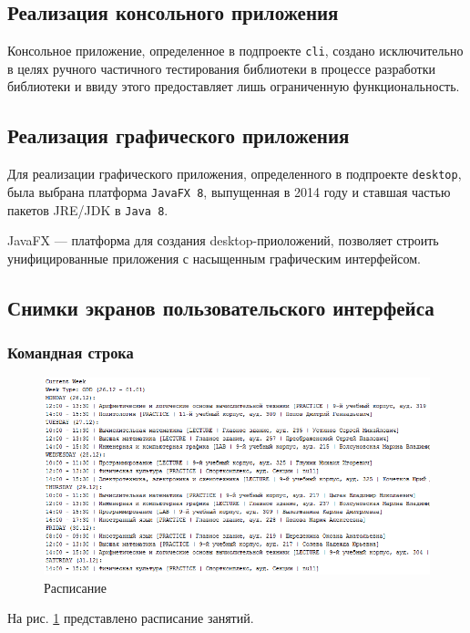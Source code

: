 \subsection{Реализация консольного приложения}

Консольное приложение, определенное в подпроекте \texttt{cli}, создано исключительно в целях ручного частичного тестирования библиотеки в процессе разработки библиотеки и ввиду этого предоставляет лишь ограниченную функциональность.

\subsection{Реализация графического приложения} 

Для реализации графического приложения, определенного в подпроекте \texttt{desktop}, была выбрана платформа \texttt{JavaFX 8}, выпущенная в 2014 году и ставшая частью пакетов JRE/JDK в \texttt{Java 8}.

JavaFX — платформа для создания desktop-приоложений, позволяет строить унифицированные приложения с насыщенным графическим интерфейсом.

\subsection{Снимки экранов пользовательского интерфейса}
\subsubsection{Командная строка}

\begin{figure}[H]
	\begin{center}
		\includegraphics[scale=0.8]{pics/1}
		\caption{Расписание} 
		\label{pic:1} %
	\end{center}
\end{figure}
На рис. \ref{pic:1} представлено расписание занятий.

